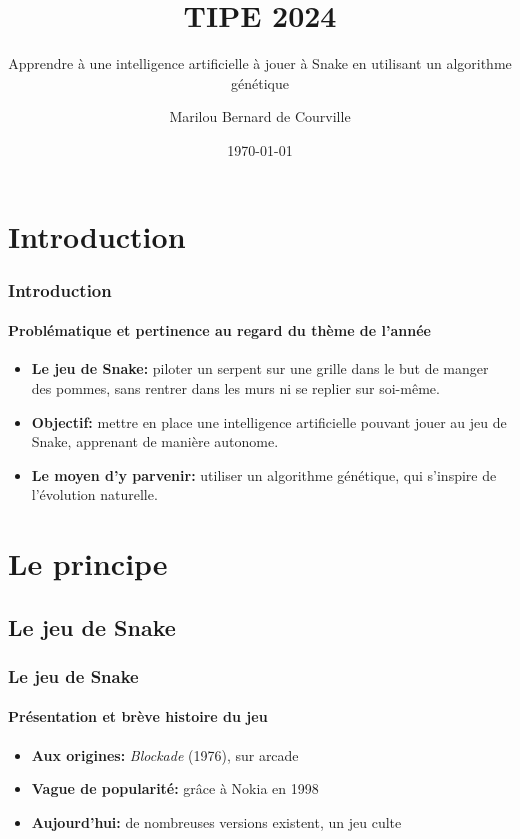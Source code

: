 \documentclass[10pt]{beamer}
\title{TIPE 2024}
\subtitle{Apprendre à une intelligence artificielle à jouer à Snake en utilisant un algorithme génétique}
\author{Marilou Bernard de Courville}
\institute{Lycée Charlemagne}
\date{\today}
\begin{document}
 
\begin{frame}
    \titlepage
\end{frame}


\section{Introduction}

\begin{frame}
\frametitle{Introduction}
\framesubtitle{Problématique et pertinence au regard du thème de l'année}

\begin{itemize}

\item \textbf{Le jeu de Snake:} piloter un serpent sur une grille dans le but de
manger des pommes, sans rentrer dans les murs ni se replier sur 
soi-même.

\item \textbf{Objectif:} mettre en place une intelligence
artificielle pouvant jouer au jeu de Snake, apprenant de manière autonome.

\item \textbf{Le moyen d'y parvenir:} utiliser un algorithme génétique,
qui s'inspire de l'évolution naturelle.

\end{itemize}

\end{frame}

\section{Le principe}

\subsection{Le jeu de Snake}


\begin{frame}
  \frametitle{Le jeu de Snake}
  \framesubtitle{Présentation et brève histoire du jeu}

  \begin{itemize}

    \item \textbf{Aux origines:} \textit{Blockade} (1976), sur arcade
    
    \item \textbf{Vague de popularité:} grâce à Nokia en 1998
    
    \item \textbf{Aujourd'hui:} de nombreuses versions existent, un jeu culte

  \end{itemize}

  \end{frame}
\end{document}
